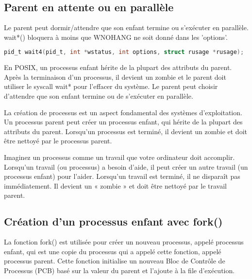 \documentclass[12pt]{report}
\begin{document}
\subsection{Parent en attente ou en parallèle}
Le parent peut dormir/attendre que son enfant termine ou s'exécuter en parallèle. wait*() bloquera à moins que WNOHANG ne soit donné dans les 'options'.
\begin{lstlisting}[language=C]
pid_t wait4(pid_t, int *wstatus, int options, struct rusage *rusage);
\end{lstlisting}
\begin{tcolorbox}[colback=yellow!5, colframe=yellow!80!black, title={\faBookmark À retenir}]
En POSIX, un processus enfant hérite de la plupart des attributs du parent. Après la terminaison d'un processus, il devient un zombie et le parent doit utiliser le syscall wait* pour l'effacer du système. Le parent peut choisir d'attendre que son enfant termine ou de s'exécuter en parallèle.
\end{tcolorbox}
\begin{tcolorbox}[colback=green!5, colframe=green!75!black, title={\faLightbulb Intuition}]
La création de processus est un aspect fondamental des systèmes d'exploitation. Un processus parent peut créer un processus enfant, qui hérite de la plupart des attributs du parent. Lorsqu'un processus est terminé, il devient un zombie et doit être nettoyé par le processus parent.
\end{tcolorbox}
\begin{tcolorbox}[colback=blue!5, colframe=blue!75!black, title={\faLightbulb Vulgarisation simple}]
Imaginez un processus comme un travail que votre ordinateur doit accomplir. Lorsqu'un travail (ou processus) a besoin d'aide, il peut créer un autre travail (un processus enfant) pour l'aider. Lorsqu'un travail est terminé, il ne disparaît pas immédiatement. Il devient un « zombie » et doit être nettoyé par le travail parent.
\end{tcolorbox}

\subsection{Création d'un processus enfant avec fork()} 

La fonction fork() est utilisée pour créer un nouveau processus, appelé processus enfant, qui est une copie du processus qui a appelé cette fonction, appelé processus parent. Cette fonction initialise un nouveau Bloc de Contrôle de Processus (PCB) basé sur la valeur du parent et l'ajoute à la file d'exécution. 
\end{document}
